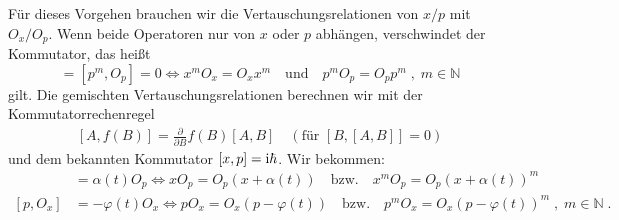   Für dieses Vorgehen brauchen wir die Vertauschungsrelationen von $x/p$ mit $O_x/O_p$.
  Wenn beide Operatoren nur von $x$ oder $p$ abhängen, verschwindet der Kommutator, das heißt
  \begin{equation}
    [x^m,O_x]=[p^m,O_p]=0\iff x^mO_x=O_xx^m\quad\text{und}\quad p^mO_p=O_pp^m\;,\; m \in \mathbb{N}
  \end{equation}
  gilt.
  Die gemischten Vertauschungsrelationen berechnen wir mit der Kommutatorrechenregel
  \begin{align}
    [A,f(B)]=\frac{\partial}{\partial B}f(B)[A,B]\quad (\text{für $[B,[A,B]]=0$})
  \end{align}
  und dem bekannten Kommutator $[x,p]=\text i \hbar$.
  Wir bekommen:
  \begin{align}
    [x,O_p]&=\alpha(t)O_p\iff xO_p=O_p(x+\alpha(t))\quad\text{bzw.}\quad
    x^mO_p=O_p(x+\alpha(t))^m \label{kommutator_1}\\
    [p,O_x]&=-\varphi(t)O_x\iff pO_x=O_x(p-\varphi(t))\quad\text{bzw.}\quad
    p^mO_x=O_x(p-\varphi(t))^m \;,\; m \in \mathbb{N} \;.\label{kommutator_2}
  \end{align}


